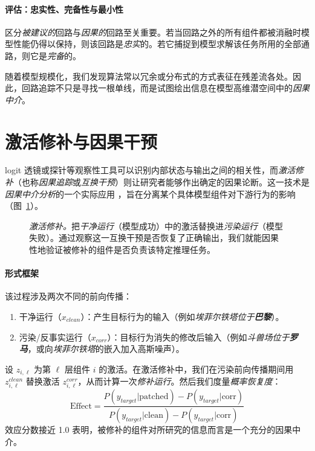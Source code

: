 \paragraph{评估：忠实性、完备性与最小性}
区分\emph{被建议的}回路与\emph{因果的}回路至关重要。若当回路之外的所有组件都被消融时模型性能仍得以保持，则该回路是\emph{忠实}的。若它捕捉到模型求解该任务所用的全部通路，则它是\emph{完备}的。

随着模型规模化，我们发现算法常以冗余或分布式的方式表征在残差流各处。因此，回路追踪不只是寻找一根单线，而是试图绘出信息在模型高维潜空间中的\emph{因果中介}。


\section{激活修补与因果干预}

logit 透镜或探针等观察性工具可以识别内部状态与输出之间的相关性，而\emph{激活修补}（也称\emph{因果追踪}或\emph{互换干预}）则让研究者能够作出确定的因果论断。这一技术是\emph{因果中介分析}的一个实际应用 \citep{vig2020investigating}，旨在分离某个具体模型组件对下游行为的影响（图~\ref{fig:activation_patching}）。

\begin{figure}[htbp]
    \centering
    \resizebox{0.65\textwidth}{!}{
        
    }
    \caption{\emph{激活修补。}把\emph{干净运行}（模型成功）中的激活替换进\emph{污染运行}（模型失败）。通过观察这一互换干预是否恢复了正确输出，我们就能因果性地验证被修补的组件是否负责该特定推理任务。}
    \label{fig:activation_patching}
\end{figure}


\paragraph{形式框架}
该过程涉及两次不同的前向传播：
\begin{enumerate}
    \item 干净运行（$x_{clean}$）：产生目标行为的输入（例如{\em 埃菲尔铁塔位于\textbf{巴黎}}）。
    \item 污染/反事实运行（$x_{corr}$）：目标行为消失的修改后输入（例如{\em 斗兽场位于\textbf{罗马}}，或向{\em 埃菲尔铁塔}的嵌入加入高斯噪声）。
\end{enumerate}

设 $z_{i, \ell}$ 为第 $\ell$ 层组件 $i$ 的激活。在激活修补中，我们在污染前向传播期间用 $z^{clean}_{i, \ell}$ 替换激活 $z^{corr}_{i, \ell}$，从而计算一次\emph{修补运行}。然后我们度量\emph{概率恢复度}：
\begin{equation}
    \text{Effect} = \frac{P(y_{target} | \text{patched}) - P(y_{target} | \text{corr})}{P(y_{target} | \text{clean}) - P(y_{target} | \text{corr})}
\end{equation}
效应分数接近 1.0 表明，被修补的组件对所研究的信息而言是一个充分的因果中介。
